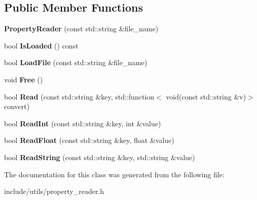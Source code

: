 \subsection*{Public Member Functions}
\begin{DoxyCompactItemize}
\item 
\mbox{\label{class_property_reader_abc11cc76bde7b5bcf04969a136e7a0cb}} 
{\bfseries Property\+Reader} (const std\+::string \&file\+\_\+name)
\item 
\mbox{\label{class_property_reader_aafffd6e846ea1434c314837d249f54e6}} 
bool {\bfseries Is\+Loaded} () const
\item 
\mbox{\label{class_property_reader_ad8004d36dc9d912d9dbc282504839d76}} 
bool {\bfseries Load\+File} (const std\+::string \&file\+\_\+name)
\item 
\mbox{\label{class_property_reader_aa3e2c0306b29848b81f66e5c99c096bd}} 
void {\bfseries Free} ()
\item 
\mbox{\label{class_property_reader_a8a309061efab2229077500997cd558ca}} 
bool {\bfseries Read} (const std\+::string \&key, std\+::function$<$ void(const std\+::string \&v)$>$ convert)
\item 
\mbox{\label{class_property_reader_a3bd75f7715c07efaf6ee3e142ac0ce6b}} 
bool {\bfseries Read\+Int} (const std\+::string \&key, int \&value)
\item 
\mbox{\label{class_property_reader_aa5362fdaff5d56fe05e43d1ee65e565d}} 
bool {\bfseries Read\+Float} (const std\+::string \&key, float \&value)
\item 
\mbox{\label{class_property_reader_a7fcff7846edc191e4154ace690711840}} 
bool {\bfseries Read\+String} (const std\+::string \&key, std\+::string \&value)
\end{DoxyCompactItemize}


The documentation for this class was generated from the following file\+:\begin{DoxyCompactItemize}
\item 
include/utils/property\+\_\+reader.\+h\end{DoxyCompactItemize}
